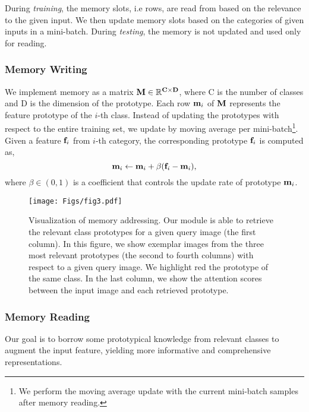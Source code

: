 \documentclass[journal]{IEEEtran}
\def\mbR{{\mathbb R}}
\begin{document}
During \emph{training}, the memory slots, i.e rows, are read from based on the relevance to the given input. We then update memory slots based on the categories of given inputs in a mini-batch. 
During \emph{testing}, the memory is not updated and used only for reading.

\subsubsection{Memory Writing}
We implement memory as a matrix $\bf M\in \mbR^{C \times D}$, where C is the number of classes and D is the dimension of the prototype. Each row ${\bf m}_{i}$ of $\bf M$ represents the feature prototype of the $i$-th class.
Instead of updating the prototypes with respect to the entire training set, we update by moving average per mini-batch\footnote[1]{We perform the moving average update with the current mini-batch samples after memory reading.}.
Given a feature ${\bf f}_{i}$ from $i$-th category, the corresponding prototype ${\bf f}_{i}$ is computed as,  
\begin{equation}
   {\bf m}_{i} \leftarrow {\bf m}_{i} + \beta({\bf f}_{i}-{\bf m}_{i}),
    \label{moving}
\end{equation}
where $\beta \in (0, 1)$  is a coefficient that controls the update rate of prototype ${\bf m}_{i}$.
\begin{figure}[t]
\begin{center}
\texttt{[image: Figs/fig3.pdf]}
\end{center}
\caption{Visualization of memory addressing. Our module is able to retrieve the relevant class prototypes for a given query image (the first column). In this figure, we show exemplar images from the three most relevant prototypes (the second to fourth columns) with respect to a given query image. We highlight red the prototype of the same class. In the last column, we show the attention scores between the input image and each retrieved prototype.}
\label{fig:3}
\end{figure}


\subsubsection{Memory Reading} \label{read}
Our goal is to borrow some prototypical knowledge from relevant classes to augment the input feature, yielding more informative and comprehensive representations.
\end{document}

